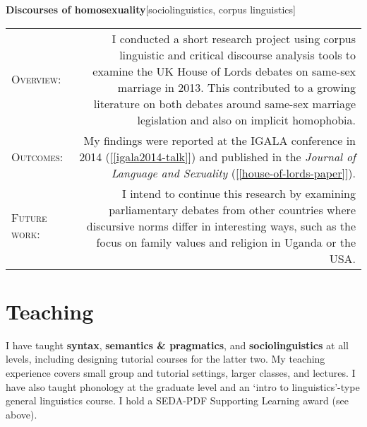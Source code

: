 \documentclass[11pt,a4paper,twoside]{article}
\makeatletter
\newlength{\rulelength}%
\newcommand{\REx}[2]{%
\vspace*{0.5\baselineskip}%
{\large\textbf{#1}\hfill\textnormal{[#2]}}%
\vspace*{0.7\baselineskip}%
}
\newenvironment{cvsection}{%
  \setlength{\extrarowheight}{0.70ex}
  \begin{longtable}[l]{@{} L R @{}}
}{%
  \end{longtable}
}
\newcommand{\sref}[1]{[\ref{#1}]}
\newcommand{\subhead}[1]{%
\textsc{#1}:%
}
\makeatother
\begin{document}
\REx{Discourses of homosexuality}{sociolinguistics, corpus linguistics}
\begin{cvsection}
  \subhead{Overview} &%
  I conducted a short research project using corpus linguistic and critical discourse analysis tools to examine the UK House of Lords debates on same-sex marriage in 2013. This contributed to a growing literature on both debates around same-sex marriage legislation and also on implicit homophobia.%
\\
  \subhead{Outcomes} &%
  My findings were reported at the IGALA conference in 2014 (\sref{igala2014-talk}) and published in the \textit{Journal of Language and Sexuality} (\sref{house-of-lords-paper}).%
\\
  \subhead{Future work} &%
  I intend to continue this research by examining parliamentary debates from other countries where discursive norms differ in interesting ways, such as the focus on family values and religion in Uganda or the USA.
\end{cvsection}


\newpage

\section*{Teaching}

I have taught \textbf{syntax}, \textbf{semantics \& pragmatics}, and \textbf{sociolinguistics} at all levels, including designing tutorial courses for the latter two. My teaching experience covers small group and tutorial settings, larger classes, and lectures. I have also taught phonology at the graduate level and an `intro to linguistics'-type general linguistics course. I hold a SEDA-PDF Supporting Learning award (see above).
\end{document}
